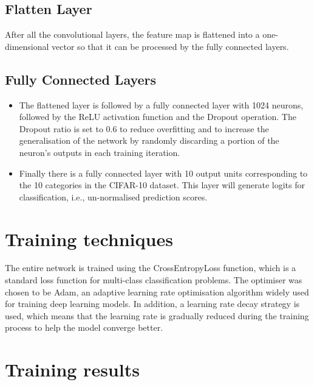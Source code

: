 \documentclass[11pt,en]{elegantpaper}
\begin{document}
\subsection{Flatten Layer}

After all the convolutional layers, the feature map is flattened into a one-dimensional vector so that it can be processed by the fully connected layers.

\subsection{Fully Connected Layers}

\begin{itemize}
  \item The flattened layer is followed by a fully connected layer with 1024 neurons, followed by the ReLU activation function and the Dropout operation. The Dropout ratio is set to 0.6 to reduce overfitting and to increase the generalisation of the network by randomly discarding a portion of the neuron's outputs in each training iteration.
  \item Finally there is a fully connected layer with 10 output units corresponding to the 10 categories in the CIFAR-10 dataset. This layer will generate logits for classification, i.e., un-normalised prediction scores.
\end{itemize}

\section{Training techniques}

The entire network is trained using the CrossEntropyLoss function, which is a standard loss function for multi-class classification problems. The optimiser was chosen to be Adam, an adaptive learning rate optimisation algorithm widely used for training deep learning models. In addition, a learning rate decay strategy is used, which means that the learning rate is gradually reduced during the training process to help the model converge better.

\section{Training results}
\end{document}
